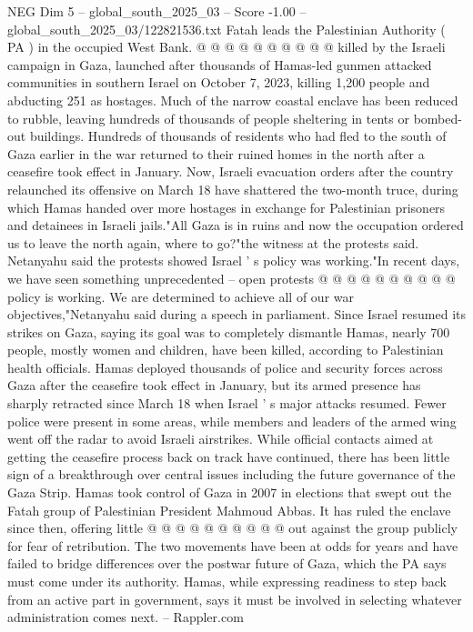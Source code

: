\begin{textsample}{NEG Dim 5 – global\_south\_2025\_03 – Score -1.00 – global\_south\_2025\_03/122821536.txt}
Fatah leads the Palestinian Authority ( PA ) in the occupied West Bank. @ @ @ @ @ @ @ @ @ @ killed by the Israeli campaign in Gaza, launched after thousands of Hamas-led gunmen attacked communities in southern Israel on October 7, 2023, killing 1,200 people and abducting 251 as hostages.
Much of the narrow coastal enclave has been reduced to rubble, leaving hundreds of thousands of people sheltering in tents or bombed-out buildings.
Hundreds of thousands of residents who had fled to the south of Gaza earlier in the war returned to their ruined homes in the north after a ceasefire took effect in January.
Now, Israeli evacuation orders after the country relaunched its offensive on March 18 have shattered the two-month truce, during which Hamas handed over more hostages in exchange for Palestinian prisoners and detainees in Israeli jails."All Gaza is in ruins and now the occupation ordered us to leave the north again, where to go?"the witness at the protests said.
Netanyahu said the protests showed Israel ' s policy was working."In recent days, we have seen something unprecedented -- open protests @ @ @ @ @ @ @ @ @ @ policy is working.
We are determined to achieve all of our war objectives,"Netanyahu said during a speech in parliament.
Since Israel resumed its strikes on Gaza, saying its goal was to completely dismantle Hamas, nearly 700 people, mostly women and children, have been killed, according to Palestinian health officials.
Hamas deployed thousands of police and security forces across Gaza after the ceasefire took effect in January, but its armed presence has sharply retracted since March 18 when Israel ' s major attacks resumed.
Fewer police were present in some areas, while members and leaders of the armed wing went off the radar to avoid Israeli airstrikes.
While official contacts aimed at getting the ceasefire process back on track have continued, there has been little sign of a breakthrough over central issues including the future governance of the Gaza Strip.
Hamas took control of Gaza in 2007 in elections that swept out the Fatah group of Palestinian President Mahmoud Abbas.
It has ruled the enclave since then, offering little @ @ @ @ @ @ @ @ @ @ out against the group publicly for fear of retribution.
The two movements have been at odds for years and have failed to bridge differences over the postwar future of Gaza, which the PA says must come under its authority.
Hamas, while expressing readiness to step back from an active part in government, says it must be involved in selecting whatever administration comes next. -- Rappler.com

\end{textsample}
